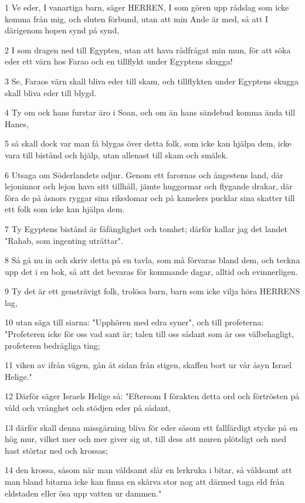 \par 1 Ve eder, I vanartiga barn, säger HERREN, I som gören upp rådslag som icke komma från mig, och sluten förbund, utan att min Ande är med, så att I därigenom hopen synd på synd,
\par 2 I som dragen ned till Egypten, utan att hava rådfrågat min mun, för att söka eder ett värn hos Farao och en tillflykt under Egyptens skugga!
\par 3 Se, Faraos värn skall bliva eder till skam, och tillflykten under Egyptens skugga skall bliva eder till blygd.
\par 4 Ty om ock hans furstar äro i Soan, och om än hans sändebud komma ända till Hanes,
\par 5 så skall dock var man få blygas över detta folk, som icke kan hjälpa dem, icke vara till bistånd och hjälp, utan allenast till skam och smälek.
\par 6 Utsaga om Söderlandets odjur. Genom ett farornas och ångestens land, där lejoninnor och lejon hava sitt tillhåll, jämte huggormar och flygande drakar, där föra de på åsnors ryggar sina rikedomar och på kamelers pucklar sina skatter till ett folk som icke kan hjälpa dem.
\par 7 Ty Egyptens bistånd är fåfänglighet och tomhet; därför kallar jag det landet "Rahab, som ingenting uträttar".
\par 8 Så gå nu in och skriv detta på en tavla, som må förvaras bland dem, och teckna upp det i en bok, så att det bevaras för kommande dagar, alltid och evinnerligen.
\par 9 Ty det är ett gensträvigt folk, trolösa barn, barn som icke vilja höra HERRENS lag,
\par 10 utan säga till siarna: "Upphören med edra syner", och till profeterna: "Profeteren icke för oss vad sant är; talen till oss sådant som är oss välbehagligt, profeteren bedrägliga ting;
\par 11 viken av ifrån vägen, gån åt sidan från stigen, skaffen bort ur vår åsyn Israel Helige."
\par 12 Därför säger Israels Helige så: "Eftersom I förakten detta ord och förtrösten på våld och vrånghet och stödjen eder på sådant,
\par 13 därför skall denna missgärning bliva för eder såsom ett fallfärdigt stycke på en hög mur, vilket mer och mer giver sig ut, till dess att muren plötsligt och med hast störtar ned och krossas;
\par 14 den krossa, såsom när man våldsamt slår en lerkruka i bitar, så våldsamt att man bland bitarna icke kan finna en skärva stor nog att därmed taga eld från eldstaden eller ösa upp vatten ur dammen."
